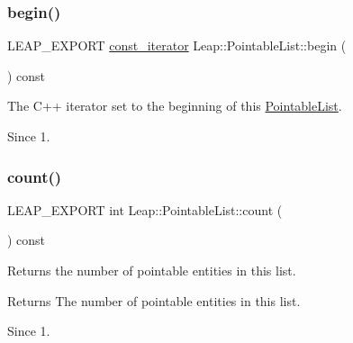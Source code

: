 \subsubsection{\texorpdfstring{begin()}{begin()}}
{\footnotesize\ttfamily L\+E\+A\+P\+\_\+\+E\+X\+P\+O\+RT \hyperlink{class_leap_1_1_pointable_list_a12b640b8c7e70885884a3a6ee903c21c}{const\+\_\+iterator} Leap\+::\+Pointable\+List\+::begin (\begin{DoxyParamCaption}{ }\end{DoxyParamCaption}) const}

The C++ iterator set to the beginning of this \hyperlink{class_leap_1_1_pointable_list}{Pointable\+List}.


\begin{DoxyCodeInclude}
\end{DoxyCodeInclude}


\begin{DoxySince}{Since}
1. 
\end{DoxySince}
\mbox{\label{class_leap_1_1_pointable_list_a639d7f8ad33281f4a6c6c822416b90fc}} 
\subsubsection{\texorpdfstring{count()}{count()}}
{\footnotesize\ttfamily L\+E\+A\+P\+\_\+\+E\+X\+P\+O\+RT int Leap\+::\+Pointable\+List\+::count (\begin{DoxyParamCaption}{ }\end{DoxyParamCaption}) const}

Returns the number of pointable entities in this list.


\begin{DoxyCodeInclude}
\end{DoxyCodeInclude}


\begin{DoxyReturn}{Returns}
The number of pointable entities in this list. 
\end{DoxyReturn}
\begin{DoxySince}{Since}
1. 
\end{DoxySince}
\mbox{\label{class_leap_1_1_pointable_list_aaa748e3113d135ce8150e917f4dc9128}} 
